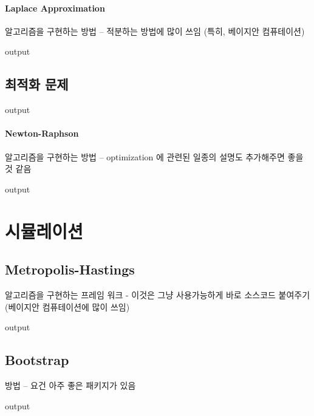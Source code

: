\documentclass{book}
\begin{document}
\paragraph{Laplace Approximation} 알고리즘을 구현하는 방법 -- 적분하는 방법에 많이 쓰임 (특히, 베이지안 컴퓨테이션) 
\begin{Schunk}
\begin{Soutput}
output
\end{Soutput}
\end{Schunk}

\subsection{최적화 문제}
\begin{Schunk}
\begin{Soutput}
output
\end{Soutput}
\end{Schunk}
\paragraph{Newton-Raphson} 알고리즘을 구현하는 방법 -- optimization 에 관련된 일종의 설명도 추가해주면 좋을 것 같음 
\begin{Schunk}
\begin{Soutput}
output
\end{Soutput}
\end{Schunk}



\section{시뮬레이션}
\subsection{Metropolis-Hastings} 알고리즘을 구현하는 프레임 워크 - 이것은 그냥 사용가능하게 바로 소스코드 붙여주기 (베이지안 컴퓨테이션에 많이 쓰임)
\begin{Schunk}
\begin{Soutput}
output
\end{Soutput}
\end{Schunk}

\subsection{Bootstrap} 
방법 -- 요건 아주 좋은 패키지가 있음 
\begin{Schunk}
\begin{Soutput}
output
\end{Soutput}
\end{Schunk}
\end{document}
